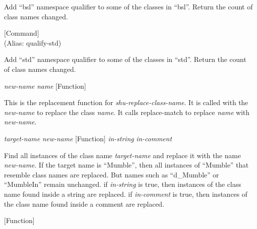 \begin{doc-string}
Add ``bsl'' namespace qualifier to some of the classes in ``bsl''.  Return the
count of class names changed.
\end{doc-string}

\vspace{1em}
\noindent
{}
\usebox{\funcname}
 \hfill [Command]\\%
 (Alias: qualify-std)

\begin{doc-string}
Add ``std'' namespace qualifier to some of the classes in ``std''.  Return the
count of class names changed.
\end{doc-string}

\vspace{1em}
\noindent
{}
\usebox{\funcname}\emph{new-name} \emph{name}
 \hfill [Function]

\begin{doc-string}
This is the replacement function for \emph{shu-replace-class-name}.  It is called
with the \emph{new-name} to replace the class \emph{name}.  It calls replace-match to replace
\emph{name} with \emph{new-name}.
\end{doc-string}

\vspace{1em}
\noindent
{}
\usebox{\funcname}\emph{target-name} \emph{new-name}
 \hfill [Function]
\hspace*{\wd\funcname}\emph{in-string} \emph{in-comment}

\begin{doc-string}
Find all instances of the class name \emph{target-name} and replace it with the name
\emph{new-name}.  If the target name is ``Mumble'', then all instances of ``Mumble''
that resemble class names are replaced.  But names such as ``d\_Mumble'' or
``MumbleIn'' remain unchanged.  if \emph{in-string} is true, then instances of the
class name found inside a string are replaced.  if \emph{in-comment} is true, then
instances of the class name found inside a comment are replaced.
\end{doc-string}

\vspace{1em}
\noindent
{}
\usebox{\funcname}
 \hfill [Function]

